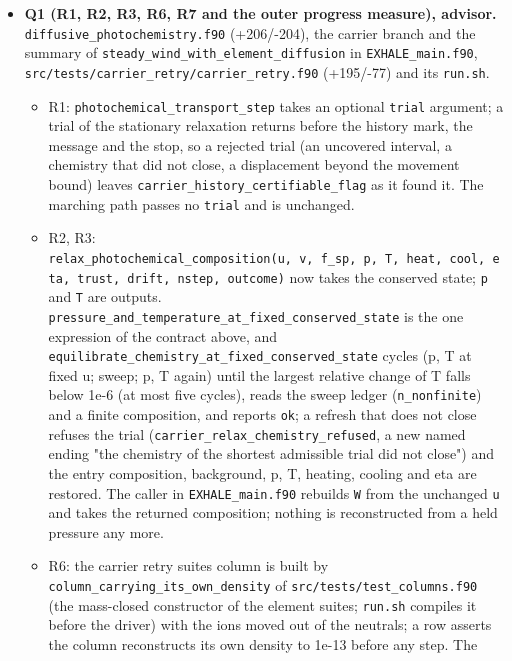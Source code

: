 \documentclass[english,a4paper]{my_memo}
\providecommand{\tightlist}{\setlength{\itemsep}{0pt}\setlength{\parskip}{0pt}}
\begin{document}
\begin{itemize}
\tightlist
\item
  \textbf{Q1 (R1, R2, R3, R6, R7 and the outer progress measure), advisor.}
  \texttt{diffusive\_photochemistry.f90} (+206/-204), the carrier branch and the
  summary of \texttt{steady\_wind\_with\_element\_diffusion} in \texttt{EXHALE\_main.f90},
  \texttt{src/tests/carrier\_retry/carrier\_retry.f90} (+195/-77) and its \texttt{run.sh}.

  \begin{itemize}
  \tightlist
  \item
    R1: \texttt{photochemical\_transport\_step} takes an optional \texttt{trial} argument; a
    trial of the stationary relaxation returns before the history mark, the
    message and the stop, so a rejected trial (an uncovered interval, a
    chemistry that did not close, a displacement beyond the movement bound)
    leaves \texttt{carrier\_history\_certifiable\_flag} as it found it. The marching
    path passes no \texttt{trial} and is unchanged.
  \item
    R2, R3: \texttt{relax\_photochemical\_composition(u,\ v,\ f\_sp,\ p,\ T,\ heat,\ cool,\ eta,\ trust,\ drift,\ nstep,\ outcome)} now takes the conserved state; \texttt{p} and
    \texttt{T} are outputs. \texttt{pressure\_and\_temperature\_at\_fixed\_conserved\_state}
    is the one expression of the contract above, and
    \texttt{equilibrate\_chemistry\_at\_fixed\_conserved\_state} cycles (p, T at fixed u;
    sweep; p, T again) until the largest relative change of T falls below
    1e-6 (at most five cycles), reads the sweep ledger (\texttt{n\_nonfinite}) and a
    finite composition, and reports \texttt{ok}; a refresh that does not close
    refuses the trial (\texttt{carrier\_relax\_chemistry\_refused}, a new named ending
    "the chemistry of the shortest admissible trial did not close") and the
    entry composition, background, p, T, heating, cooling and eta are
    restored. The caller in \texttt{EXHALE\_main.f90} rebuilds \texttt{W} from the unchanged
    \texttt{u} and takes the returned composition; nothing is reconstructed from a
    held pressure any more.
  \item
    R6: the carrier retry suite\textquotesingle s column is built by
    \texttt{column\_carrying\_its\_own\_density} of \texttt{src/tests/test\_columns.f90} (the
    mass-closed constructor of the element suites; \texttt{run.sh} compiles it
    before the driver) with the ions moved out of the neutrals; a row asserts
    the column reconstructs its own density to 1e-13 before any step. The

\end{itemize}
\end{itemize}
\end{document}
